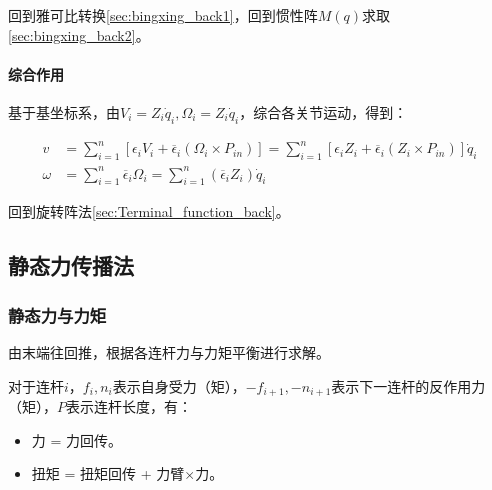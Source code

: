 \documentclass[
12pt, %
a4paper, 
oneside, %
headinclude,footinclude, %
]{scrartcl}
\begin{document}
回到雅可比转换\ref{sec:bingxing_back1}，回到惯性阵$ M(q) $求取\ref{sec:bingxing_back2}。
\paragraph{综合作用}\label{sec:Terminal_function}
基于基坐标系，由$ V_i = Z_i \dot{q}_i, \Omega_i = Z_i \dot{q}_i $，综合各关节运动，得到：

\begin{align*}
v &= \sum_{i = 1}^n [\epsilon_i V_i + \overline{\epsilon}_i (\Omega_i \times P_{in})] = \sum_{i = 1}^n [\epsilon_i Z_i + \overline{\epsilon}_i (Z_i \times P_{in})] \dot{q}_i \\
\omega &= \sum_{i = 1}^n \overline{\epsilon}_i \Omega_i = \sum_{i = 1}^n (\overline{\epsilon}_i Z_i) \dot{q}_i
\end{align*}

回到旋转阵法\ref{sec:Terminal_function_back}。
\subsection[静态力传播法]{静态力传播法}
\subsubsection[静态力与力矩]{静态力与力矩}\label{sec:fn1}
由末端往回推，根据各连杆力与力矩平衡进行求解。

对于连杆$ i $，$ f_i, n_i $表示自身受力（矩），$ -f_{i + 1}, -n_{i + 1} $表示下一连杆的反作用力（矩），$ P $表示连杆长度，有：
\begin{itemize}
\item 力 = 力回传。
\item 扭矩 = 扭矩回传 + 力臂$ \times $力。
\end{itemize} 
\end{document}
